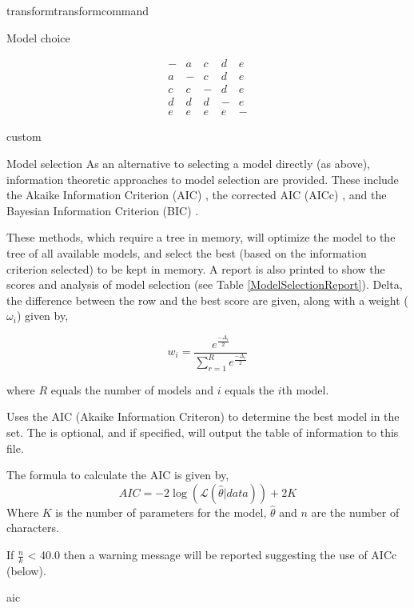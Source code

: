 \begin{command}{transform}{transformcommand}
\begin{arguments}
\begin {argumentgroup} {Model choice}
{\begin{equation*}
\begin{array}{ccccc}
- & a & c & d & e \\
a & - & c & d & e \\
c & c & - & d & e \\
d & d & d & - & e \\
e & e & e & e & -
\end{array}
\end{equation*}


}
{custom}

\end{argumentgroup}


\begin {argumentgroup}{Model selection}    
As an alternative to selecting a model directly (as above), information 
theoretic approaches to model selection are provided.
These include the Akaike Information Criterion (AIC)
\cite{akaike1973}, the corrected AIC (AICc)
\cite{sugiura1978}, and the Bayesian Information Criterion (BIC)
\cite{schwarz1978}.

These methods, which require a tree in memory, will optimize the model
to the tree of all available models, and select the best (based
on the information criterion selected) to be kept in memory. A
report is also printed to show the scores and analysis of model
selection (see Table \ref {ModelSelectionReport}). Delta, the 
difference between the row and the best score are given, along
with a weight (${\omega_i}$) given by,

\begin{equation*}
w_{i} = \frac{e^{\frac{-\Delta_i}{2}}}
{\sum^R_{r=1} e^{\frac{-\Delta_r}{2}}}
\end{equation*}

where $R$ equals the number of models and $i$ equals the $i$th model. 

{Uses the AIC (Akaike Information Criteron) to determine
the best model in the set. The \poystring is optional, and if specified, 
\poy will output the table of information to this file. 

The formula to calculate the
AIC is given by,
\begin{equation*}
AIC = - 2 \log(\mathcal{L}(\hat{\theta}|data)) + 2 K
\end{equation*}
Where $K$ is the number of parameters for the model,
$\hat{\theta}$ and $n$ are the number of characters. 
\begin{statement}
If $\frac{n}{k}$ < 40.0 then a warning message will be
reported suggesting the use of AICc (below).
\end{statement} }
{aic}


\end{argumentgroup}
\end{arguments}
\end{command}
